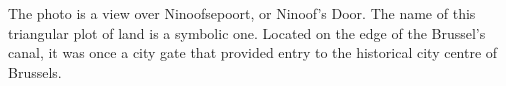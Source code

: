 \documentclass{article}[11pt]
\begin{document}

The photo is a view over Ninoofsepoort, or Ninoof's Door. The name of this triangular plot of land is a symbolic one. Located on the edge of the Brussel's canal, it was once a city gate that provided entry to the historical city centre of Brussels. 
\end{document}
